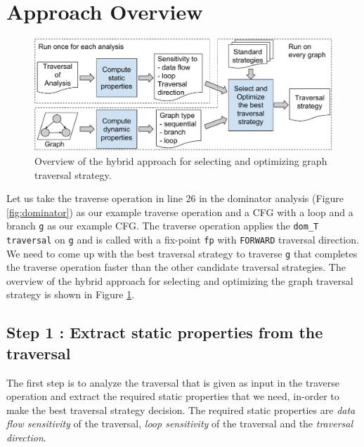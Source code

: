 \section{Approach Overview}
\label{sec:approach-overview}


\begin{figure}[ht!]
  \centering
  \includegraphics[width=\linewidth]{figures/overview.pdf}
\caption{Overview of the hybrid approach for selecting and optimizing graph traversal strategy.}
  \label{fig:overview}
\end{figure}

Let us take the traverse operation in line 26 in the dominator analysis (Figure \ref{fig:dominator}) as our example traverse operation and a CFG with a loop and a branch \texttt{g} as our example CFG. The traverse operation applies the \texttt{dom\_T traversal} on \texttt{g} and is called with a fix-point \texttt{fp} with \texttt{FORWARD} traversal direction. We need to come up with the best traversal strategy to traverse \texttt{g} that completes the traverse operation faster than the other candidate traversal strategies. The overview of the hybrid approach for selecting and optimizing the graph traversal strategy is shown in Figure \ref{fig:overview}.

\subsection{Step 1 : Extract static properties from the traversal}
The first step is to analyze the traversal that is given as input in the traverse operation and extract the required static properties that we need, in-order to make the best traversal strategy decision. The required static properties are \textit{data flow sensitivity} of the traversal,%
\textit{loop sensitivity} of the traversal and the \textit{traversal direction}.

